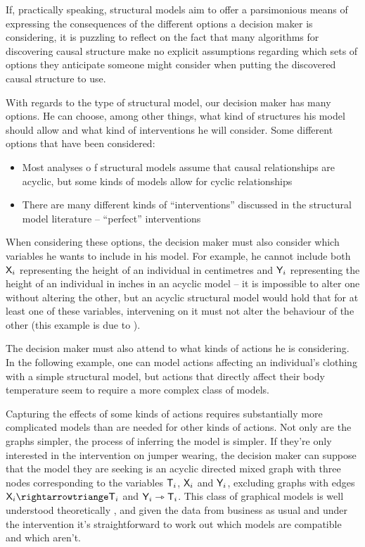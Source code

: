 If, practically speaking, structural models aim to offer a parsimonious means of expressing the consequences of the different options a decision maker is considering, it is puzzling to reflect on the fact that many algorithms for discovering causal structure make no explicit assumptions regarding which sets of options they anticipate someone might consider when putting the discovered causal structure to use. 

With regards to the type of structural model, our decision maker has many options. He can choose, among other things, what kind of structures his model should allow and what kind of interventions he will consider. Some different options that have been considered:
\begin{itemize}
    \item Most analyses o f structural models assume that causal relationships are acyclic, but some kinds of models allow for cyclic relationships \citep{bongers_theoretical_2016,forre_causal_2020}
    \item There are many different kinds of ``interventions'' discussed in the structural model literature -- ``perfect'' interventions 
\end{itemize}

When considering these options, the decision maker must also consider which variables he wants to include in his model. For example, he cannot include both $\mathsf{X}_i$ representing the height of an individual in centimetres and $\mathsf{Y}_i$ representing the height of an individual in inches in an acyclic model -- it is impossible to alter one without altering the other, but an acyclic structural model would hold that for at least one of these variables, intervening on it must not alter the behaviour of the other (this example is due to \citet{eberhardt_contemporary_2022}).

The decision maker must also attend to what kinds of actions he is considering. In the following example, one can model actions affecting an individual's clothing with a simple structural model, but actions that directly affect their body temperature seem to require a more complex class of models.



Capturing the effects of some kinds of actions requires substantially more complicated models than are needed for other kinds of actions. Not only are the graphs simpler, the process of inferring the model is simpler. If they're only interested in the intervention on jumper wearing, the decision maker can suppose that the model they are seeking is an acyclic directed mixed graph with three nodes corresponding to the variables $\mathsf{T}_i$, $\mathsf{X}_i$ and $\mathsf{Y}_i$, excluding graphs with edges $\RV{X}_i\rightarrowtriange \RV{T}_i$ and $\mathsf{Y}_i\rightarrowtriangle \mathsf{T}_i$. This class of graphical models is well understood theoretically \citet{shpitser_parameter_2012}, and given the data from business as usual and under the intervention it's straightforward to work out which models are compatible and which aren't.

